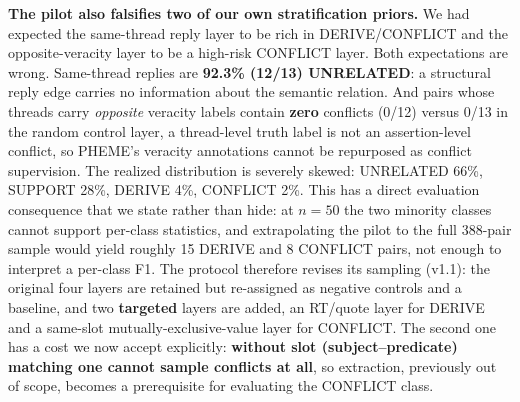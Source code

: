 \textbf{The pilot also falsifies two of our own stratification priors.} We had expected the same-thread reply layer to be rich in DERIVE/CONFLICT and the opposite-veracity layer to be a high-risk CONFLICT layer. Both expectations are wrong. Same-thread replies are \textbf{92.3\% (12/13) UNRELATED}: a structural reply edge carries no information about the semantic relation. And pairs whose threads carry \emph{opposite} veracity labels contain \textbf{zero} conflicts (0/12) versus 0/13 in the random control layer, a thread-level truth label is not an assertion-level conflict, so PHEME's veracity annotations cannot be repurposed as conflict supervision. The realized distribution is severely skewed: UNRELATED 66\%, SUPPORT 28\%, DERIVE 4\%, CONFLICT 2\%. This has a direct evaluation consequence that we state rather than hide: at $n{=}50$ the two minority classes cannot support per-class statistics, and extrapolating the pilot to the full 388-pair sample would yield roughly 15 DERIVE and 8 CONFLICT pairs, not enough to interpret a per-class F1. The protocol therefore revises its sampling (v1.1): the original four layers are retained but re-assigned as negative controls and a baseline, and two \textbf{targeted} layers are added, an RT/quote layer for DERIVE and a same-slot mutually-exclusive-value layer for CONFLICT. The second one has a cost we now accept explicitly: \textbf{without slot (subject--predicate) matching one cannot sample conflicts at all}, so extraction, previously out of scope, becomes a prerequisite for evaluating the CONFLICT class.
